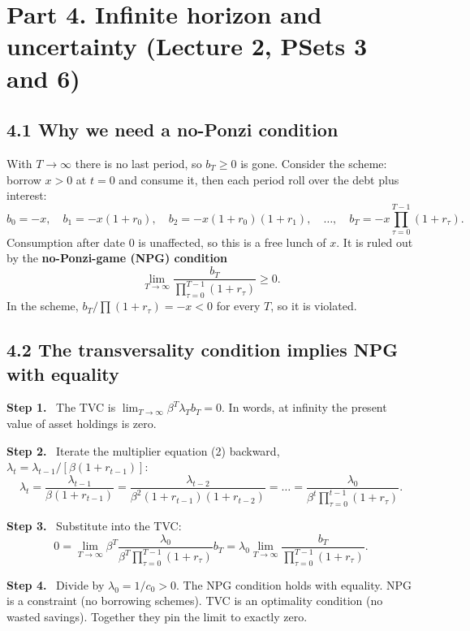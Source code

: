 \documentclass[12pt]{article}
\newcommand{\st}[1]{\par\smallskip\textbf{Step #1.}\ }
\newcommand{\ans}[1]{\[\boxed{\ #1\ }\]}
\begin{document}
\section*{Part 4. Infinite horizon and uncertainty (Lecture 2, PSets 3 and 6)}

\subsection*{4.1 Why we need a no-Ponzi condition}
With $T\to\infty$ there is no last period, so $b_T\ge0$ is gone. Consider
the scheme: borrow $x>0$ at $t=0$ and consume it, then each period roll over
the debt plus interest:
\[
b_0=-x,\quad b_1=-x(1+r_0),\quad b_2=-x(1+r_0)(1+r_1),\quad\dots,\quad b_T=-x\prod_{\tau=0}^{T-1}(1+r_\tau).
\]
Consumption after date 0 is unaffected, so this is a free lunch of $x$. It is
ruled out by the \textbf{no-Ponzi-game (NPG) condition}
\ans{\lim_{T\to\infty}\frac{b_T}{\prod_{\tau=0}^{T-1}(1+r_\tau)}\ge0 .}
In the scheme, $b_T/\prod(1+r_\tau)=-x<0$ for every $T$, so it is violated.

\subsection*{4.2 The transversality condition implies NPG with equality}
\st{1} The TVC is $\lim_{T\to\infty}\beta^T\lambda_Tb_T=0$. In words, at
infinity the present value of asset holdings is zero.
\st{2} Iterate the multiplier equation (2) backward, $\lambda_t=\lambda_{t-1}/[\beta(1+r_{t-1})]$:
\[
\lambda_t=\frac{\lambda_{t-1}}{\beta(1+r_{t-1})}=\frac{\lambda_{t-2}}{\beta^2(1+r_{t-1})(1+r_{t-2})}=\dots=\frac{\lambda_0}{\beta^t\prod_{\tau=0}^{t-1}(1+r_\tau)} .
\]
\st{3} Substitute into the TVC:
\[
0=\lim_{T\to\infty}\beta^T\frac{\lambda_0}{\beta^T\prod_{\tau=0}^{T-1}(1+r_\tau)}b_T=\lambda_0\lim_{T\to\infty}\frac{b_T}{\prod_{\tau=0}^{T-1}(1+r_\tau)} .
\]
\st{4} Divide by $\lambda_0=1/c_0>0$. The NPG condition holds with equality.
NPG is a constraint (no borrowing schemes). TVC is an optimality condition (no
wasted savings). Together they pin the limit to exactly zero.
\end{document}
